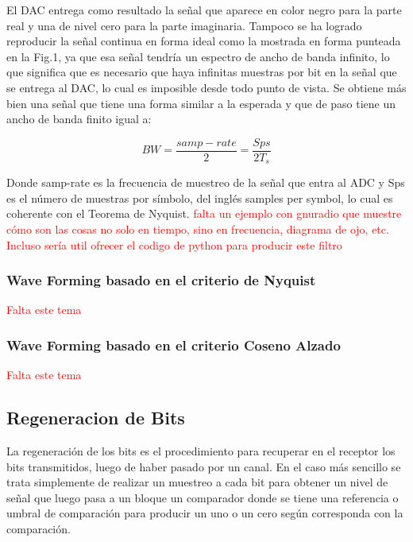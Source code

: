 El DAC entrega como resultado la señal que aparece en color negro para la parte real y una de nivel cero para la parte imaginaria. Tampoco se ha logrado reproducir la señal continua en forma ideal como la mostrada en forma punteada en la Fig.1, ya que esa señal tendría un espectro de ancho de banda infinito, lo que significa que es necesario que haya infinitas muestras por bit en la señal que se entrega al DAC, lo cual es imposible desde todo punto de vista. Se obtiene más bien una señal que tiene una forma similar a la esperada y que de paso tiene un ancho de banda finito igual a:

\begin{equation} \label{capcuatro_veintidos}
	 BW = \frac{samp-rate}{2}=\frac{Sps}{2T_{s}} 
\end{equation}

Donde samp-rate es la frecuencia de muestreo de la señal que entra al ADC y Sps es el número de muestras por símbolo, del inglés samples per symbol, lo cual es coherente con el Teorema de Nyquist.
\textcolor{red}{falta un ejemplo con gnuradio que muestre cómo son las cosas no solo en tiempo, sino en frecuencia, diagrama de ojo, etc. Incluso sería util ofrecer el codigo de python para producir este filtro}
\subsubsection{Wave Forming basado en el criterio de Nyquist}
\textcolor{red}{Falta este tema}

\subsubsection{Wave Forming basado en el criterio Coseno Alzado}
\textcolor{red}{Falta este tema}

\subsection{Regeneracion de Bits}
La regeneración de los bits es el procedimiento para recuperar en el receptor los bits transmitidos, luego de haber pasado por un canal. En el caso más sencillo se trata simplemente de realizar un muestreo a cada bit para obtener un nivel de señal que luego pasa a un bloque un comparador donde se tiene una referencia o umbral de comparación para producir un uno o un cero según corresponda con la comparación.\\



